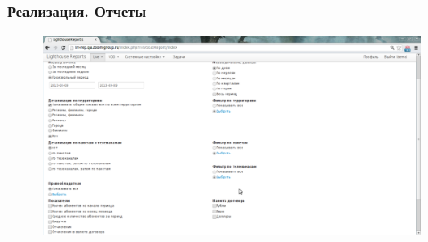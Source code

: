 \documentclass{beamer}
\begin{document}
%
%





\begin{frame}
\frametitle{Реализация. Отчеты}
\begin{figure}
\vspace{-1cm}
\hspace*{-1cm} \includegraphics[scale=0.3]{../resources/lm_screen.pdf}
\end{figure}
\end{frame}
\end{document}
